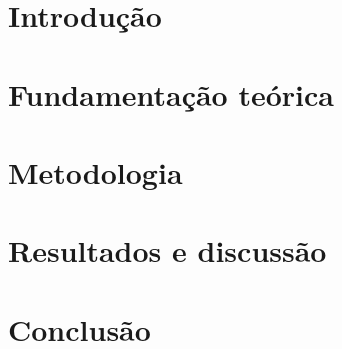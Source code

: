 \documentclass[oneside,monografia]{iftex2020}
\begin{document}
\maketitle

\chapter{Introdução} \label{cap:introducao}



\chapter{Fundamentação teórica} \label{cap:fundamentacao_teorica}



\chapter{Metodologia} \label{cap:metodologia}



\chapter{Resultados e discussão} \label{cap:resultados}



\chapter{Conclusão} \label{cap:conclusao}



\postextual


\printbibliography[notkeyword=exemplo]
\end{document}
